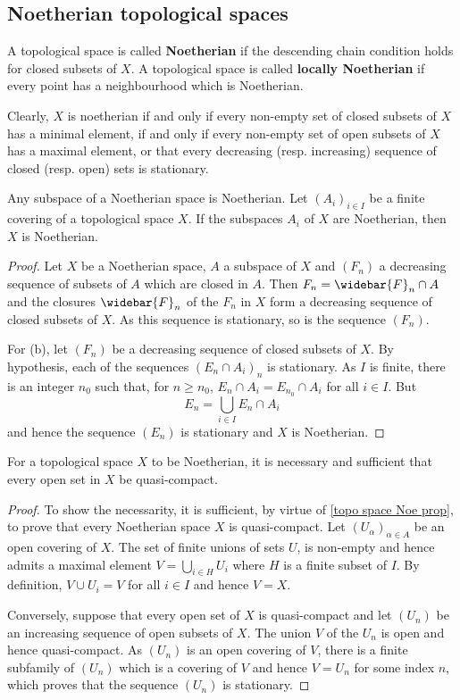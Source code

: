 \subsection{Noetherian topological spaces}
\begin{definition}
A topological space is called \textbf{Noetherian} if the descending chain condition holds for closed subsets of $X$. A topological space is called \textbf{locally Noetherian} if every point has a neighbourhood which is Noetherian.
\end{definition}
Clearly, $X$ is noetherian if and only if every non-empty set of closed subsets of $X$ has a minimal element, if and only if every non-empty set of open subsets of $X$ has a maximal element, or that every decreasing (resp. increasing) sequence of closed (resp. open) sets is stationary.
\begin{proposition}\label{topo space Noe prop}
Any subspace of a Noetherian space is Noetherian. Let $(A_i)_{i\in I}$ be a finite covering of a topological space $X$. If the subspaces $A_i$ of $X$ are Noetherian, then $X$ is Noetherian.
\end{proposition}
\begin{proof}
Let $X$ be a Noetherian space, $A$ a subspace of $X$ and $(F_n)$ a decreasing sequence of subsets of $A$ which are closed in $A$. Then $F_n=\widebar{F}_n\cap A$ and the closures $\widebar{F}_n$ of the $F_n$ in $X$ form a decreasing sequence of closed subsets of $X$. As this sequence is stationary, so is the sequence $(F_n)$.\par
For (b), let $(F_n)$ be a decreasing sequence of closed subsets of $X$. By hypothesis, each of the sequences $(E_n\cap A_i)_n$ is stationary. As $I$ is finite, there is an integer $n_0$ such that, for $n\geq n_0$, $E_n\cap A_i=E_{n_0}\cap A_i$ for all $i\in I$. But
\[E_n=\bigcup_{i\in I}E_n\cap A_i\]
and hence the sequence $(E_n)$ is stationary and $X$ is Noetherian.
\end{proof}
\begin{proposition}\label{topo space Noe iff quasi-compact}
For a topological space $X$ to be Noetherian, it is necessary and sufficient that every open set in $X$ be quasi-compact.
\end{proposition}
\begin{proof}
To show the necessarity, it is sufficient, by virtue of \cref{topo space Noe prop}, to prove that every Noetherian space $X$ is quasi-compact. Let $(U_\alpha)_{\alpha\in A}$ be an open covering of $X$. The set of finite unions of sets $U$, is non-empty and hence admits a maximal element $V=\bigcup_{i\in H}U_i$ where $H$ is a finite subset of $I$. By definition, $V\cup U_i=V$ for all $i\in I$ and hence $V=X$.\par
Conversely, suppose that every open set of $X$ is quasi-compact and let $(U_n)$ be an increasing sequence of open subsets of $X$. The union $V$ of the $U_n$ is open and hence quasi-compact. As $(U_n)$ is an open covering of $V$, there is a finite subfamily of $(U_n)$ which is a covering of $V$ and hence $V=U_n$ for some index $n$, which proves that the sequence $(U_n)$ is stationary.
\end{proof}
